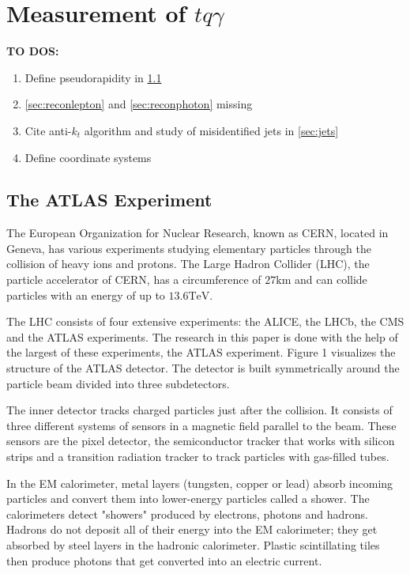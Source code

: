 


\chapter{Measurement of \texorpdfstring{$tq\gamma$}{tqGamma}}
\label{chap:measurement}
\textbf{TO DOS:}
\begin{enumerate}
    \item Define pseudorapidity in \ref{sec:atlas}
    \item \ref{sec:reconlepton} and \ref{sec:reconphoton} missing
    \item Cite anti-$k_t$ algorithm and study of misidentified jets in \ref{sec:jets}
    \item Define coordinate systems
\end{enumerate}


\section{The ATLAS Experiment}
\label{sec:atlas}
The European Organization for Nuclear Research, known as CERN, located in Geneva, has various experiments studying elementary particles through the collision of heavy ions and protons. 
The Large Hadron Collider (LHC), the particle accelerator of CERN, has a circumference of $27 \si{\kilo\metre}$ and can collide particles with an energy of up to $13.6 \si{\tera\electronvolt}$. 


The LHC consists of four extensive experiments: the ALICE, the LHCb, the CMS and the ATLAS experiments. The research in this paper is done with the help of the largest of these experiments, the ATLAS experiment. Figure 1 visualizes the structure of the ATLAS detector.  The detector is built symmetrically around the particle beam divided into three subdetectors.

The inner detector tracks charged particles just after the collision. It consists of three different systems of sensors in a magnetic field parallel to the beam. These sensors are the pixel detector, the semiconductor tracker that works with silicon strips and a transition radiation tracker to track particles with gas-filled tubes. 

In the EM calorimeter, metal layers (tungsten, copper or lead) absorb incoming particles and convert them into lower-energy particles called a shower. The calorimeters detect "showers" produced by electrons, photons and hadrons. 
Hadrons do not deposit all of their energy into the EM calorimeter; they get absorbed by steel layers in the hadronic calorimeter. 
Plastic scintillating tiles then produce photons that get converted into an electric current. 

